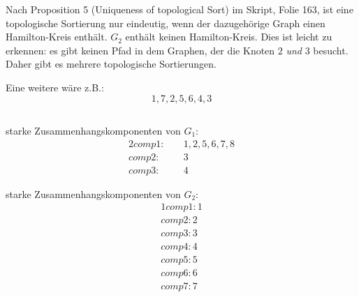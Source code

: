 \documentclass[10pt,a4paper,oneside,ngerman,numbers=noenddot]{scrartcl}
\begin{document}
          Nach Proposition 5 (Uniqueness of topological Sort) im Skript, Folie 163, ist eine topologische Sortierung nur eindeutig, wenn der dazugehörige Graph einen Hamilton-Kreis enthält. $G_2$ enthält keinen Hamilton-Kreis. Dies ist leicht zu erkennen: es gibt keinen Pfad in dem Graphen, der die Knoten $2$ \textit{und} $3$ besucht. Daher gibt es mehrere topologische Sortierungen.
          
          Eine weitere wäre z.B.:
          \[
                1, 7, 2, 5, 6, 4, 3
          \]
	\subsection{} %
		starke Zusammenhangskomponenten von $G_{1}:$
		\begin{alignat*}{2}
			comp1:&&\; 1, 2, 5, 6, 7, 8 \\
			comp2:&&\; 3 \\
			comp3:&&\; 4
		\end{alignat*}
		
		starke Zusammenhangskomponenten von $G_{2}:$
		\begin{alignat*}{1}
			comp1: 1 \\
			comp2: 2 \\
			comp3: 3 \\
			comp4: 4 \\
			comp5: 5 \\
			comp6: 6 \\
			comp7: 7
		\end{alignat*}
\section{} %
\end{document}
